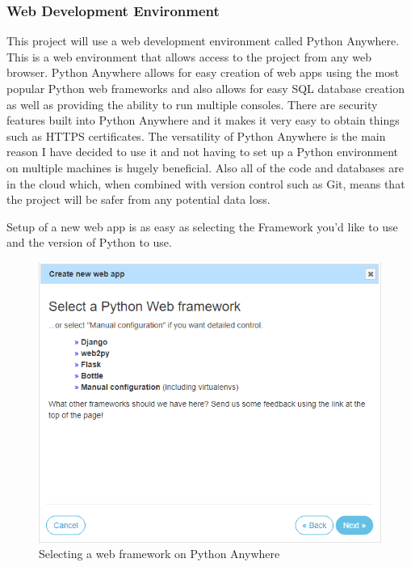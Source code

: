 \documentclass[10pt,a4paper]{article}
\begin{document}
\subsubsection{Web Development Environment}
This project will use a web development environment called Python Anywhere. This is a web environment that allows access to the project from any web browser. Python Anywhere allows for easy creation of web apps using the most popular Python web frameworks and also allows for easy SQL database creation as well as providing the ability to run multiple consoles. There are security features built into Python Anywhere and it makes it very easy to obtain things such as HTTPS certificates. The versatility of Python Anywhere is the main reason I have decided to use it and not having to set up a Python environment on multiple machines is hugely beneficial. Also all of the code and databases are in the cloud which, when combined with version control such as Git, means that the project will be safer from any potential data loss.

Setup of a new web app is as easy as selecting the Framework you'd like to use and the version of Python to use.

\begin{figure}[H]
\centering
  \includegraphics[width=\linewidth]{images/webappframework.png}
  \caption{Selecting a web framework on Python Anywhere}
  \label{fig:picamera}
\end{figure}
\end{document}
